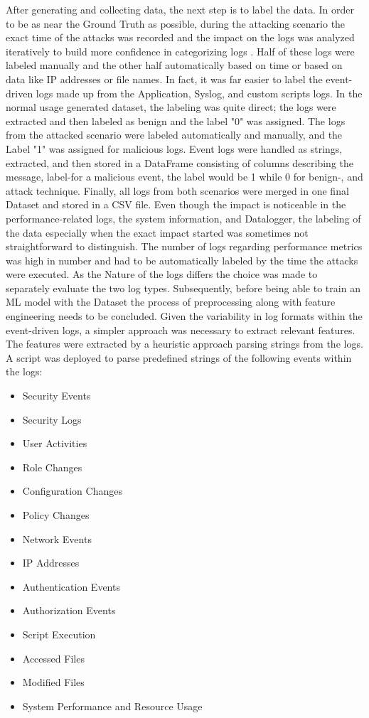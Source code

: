 \documentclass[Master,BMR,english]{twbook}
\begin{document}
After generating and collecting data, the next step is to label the data. In order to be as near the Ground Truth as possible, during the attacking scenario the exact time of the attacks was recorded and the impact on the logs was analyzed iteratively to build more confidence in categorizing logs \cite{lemay_providing_nodate}. Half of these logs were labeled manually and the other half automatically based on time or based on data like IP addresses or file names. In fact, it was far easier to label the event-driven logs made up from the Application, Syslog, and custom scripts logs. In the normal usage generated dataset, the labeling was quite direct; the logs were extracted and then labeled as benign and the label "0" was assigned. The logs from the attacked scenario were labeled automatically and manually, and the Label "1" was assigned for malicious logs. Event logs were handled as strings, extracted, and then stored in a DataFrame consisting of columns describing the message, label-for a malicious event, the label would be 1 while 0 for benign-, and attack technique. Finally, all logs from both scenarios were merged in one final Dataset and stored in a CSV file. Even though the impact is noticeable in the performance-related logs, the system information, and Datalogger, the labeling of the data especially when the exact impact started was sometimes not straightforward to distinguish. The number of logs regarding performance metrics was high in number and had to be automatically labeled by the time the attacks were executed. As the Nature of the logs differs the choice was made to separately evaluate the two log types. Subsequently, before being able to train an ML model with the Dataset the process of preprocessing along with feature engineering needs to be concluded. Given the variability in log formats within the event-driven logs, a simpler approach was necessary to extract relevant features. The features were extracted by a heuristic approach parsing strings from the logs. A script was deployed to parse predefined strings of the following events within the logs:

\begin{itemize}
    \item Security Events
    \item Security Logs
    \item User Activities
    \item Role Changes
    \item Configuration Changes
    \item Policy Changes
    \item Network Events
    \item IP Addresses
    \item Authentication Events
    \item Authorization Events
    \item Script Execution
    \item Accessed Files
    \item Modified Files
    \item System Performance and Resource Usage
\end{itemize}
\end{document}
